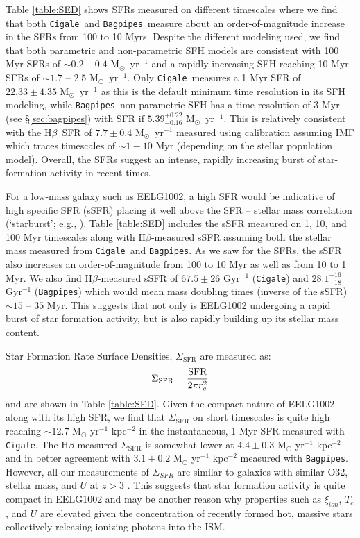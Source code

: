 \documentclass[twocolumn,tight,times,linenumbers]{aastex631}
\newcommand{\hbeta}{H$\beta$}
\newcommand{\msol}{M$_\odot$}
\newcommand{\xiion}{$\xi_{ion}$}
\newcommand{\cigale}{\texttt{Cigale}}
\newcommand{\bagpipes}{\texttt{Bagpipes}}
\begin{document}
		
		Table \ref{table:SED} shows SFRs measured on different timescales where we find that both \cigale~and \bagpipes~measure about an order-of-magnitude increase in the SFRs from 100 to 10 Myrs. Despite the different modeling used, we find that both parametric and non-parametric SFH models are consistent with 100 Myr SFRs of $\sim 0.2$ -- $0.4$ \msol~yr$^{-1}$ and a rapidly increasing SFH reaching 10 Myr SFRs of $\sim 1.7$ -- $2.5$ \msol~yr$^{-1}$. Only \cigale~measures a 1 Myr SFR of $22.33\pm4.35$ \msol~yr$^{-1}$ as this is the default minimum time resolution in its SFH modeling, while \bagpipes~non-parametric SFH has a time resolution of 3 Myr (see \S\ref{sec:bagpipes}) with SFR if $5.39^{+0.22}_{-0.16}$ \msol~yr$^{-1}$. This is relatively consistent with the \hbeta~SFR of $7.7\pm0.4$ \msol~yr$^{-1}$ measured using \cite{Kennicutt1998} calibration assuming \cite{Chabrier2003} IMF which traces timescales of $\sim 1 - 10$ Myr (depending on the stellar population model). Overall, the SFRs suggest an intense, rapidly increasing burst of star-formation activity in recent times.
		
		For a low-mass galaxy such as EELG1002, a high SFR would be indicative of high specific SFR (sSFR)  placing it well above the SFR -- stellar mass correlation (`starburst'; e.g., \citealt{Speagle2014}). Table \ref{table:SED} includes the sSFR measured on 1, 10, and 100 Myr timescales along with \hbeta-measured sSFR assuming both the stellar mass measured from \cigale~and \bagpipes. As we saw for the SFRs, the sSFR also increases an order-of-magnitude from 100 to 10 Myr as well as from 10 to 1 Myr. We also find \hbeta-measured sSFR of $67.5\pm26$ Gyr$^{-1}$ (\cigale) and $28.1^{+16}_{-18}$ Gyr$^{-1}$ (\bagpipes) which would mean mass doubling times (inverse of the sSFR) $\sim  15$ -- $35$ Myr. This suggests that not only is EELG1002 undergoing a rapid burst of star formation activity, but is also rapidly building up its stellar mass content. 
		
		Star Formation Rate Surface Densities, $\Sigma_\textrm{SFR}$ are measured as:
		\begin{equation}
			\centering
			\Sigma_\textrm{SFR} = \frac{\textrm{SFR}}{2 \pi r_e^2}
			\label{eqn:sigma_SFR}
		\end{equation}
		and are shown in Table \ref{table:SED}. Given the compact nature of EELG1002 along with its high SFR, we find that $\Sigma_\textrm{SFR}$ on short timescales is quite high reaching $\sim 12.7$ M$_\odot$ yr$^{-1}$ kpc$^{-2}$ in the instantaneous, 1 Myr SFR measured with \cigale. The \hbeta-measured $\Sigma_\textrm{SFR}$ is somewhat lower at $4.4\pm0.3$ M$_\odot$ yr$^{-1}$ kpc$^{-2}$ and in better agreement with $3.1\pm0.2$ M$_\odot$ yr$^{-1}$ kpc$^{-2}$ measured with \bagpipes. However, all our measurements of $\Sigma_{SFR}$ are similar to galaxies with similar O32, stellar mass, and $U$ at $z > 3$ \citep{Reddy2023}. This suggests that star formation activity is quite compact in EELG1002 and may be another reason why properties such as \xiion, $T_e$, and $U$ are elevated given the concentration of recently formed hot, massive stars collectively releasing ionizing photons into the ISM.
		
\end{document}
